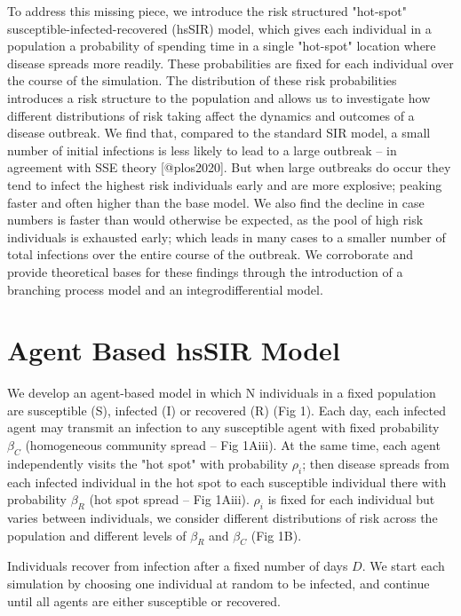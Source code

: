 \documentclass[9pt,twocolumn,twoside, lineno]{pnas-new}
\begin{document}
To address this missing piece, we introduce the risk structured "hot-spot"
susceptible-infected-recovered (hsSIR) model, which gives each individual
in a population a probability of spending time in a single "hot-spot" location
where disease spreads more readily. These probabilities are fixed for each individual
over the course of the simulation. The distribution of these risk probabilities
introduces a risk structure to the population and allows us to investigate how
different distributions of risk taking affect the dynamics and outcomes of
a disease outbreak. We find that, compared to the standard SIR model, a small
number of initial infections is less likely to lead to a large outbreak  – in
agreement with SSE theory [@plos2020]. But when large outbreaks do occur they
tend to infect the highest risk individuals early and are more explosive;
peaking faster and often higher than the base model. We also find the decline
in case numbers is faster than would otherwise be expected, as the pool of high
risk individuals is exhausted early; which leads in many cases to a smaller
number of total infections over the entire course of the outbreak. We
corroborate and provide theoretical bases for these findings through the
introduction of a branching process model and an integrodifferential model.


\section*{Agent Based hsSIR Model}

We develop an agent-based model in which N individuals in a fixed population
are susceptible (S), infected (I) or recovered (R) (Fig 1). Each day, each
infected agent may transmit an infection to any susceptible agent with fixed
probability $\beta_C$ (homogeneous community spread – Fig 1Aiii). At the same
time, each agent independently visits the "hot spot" with probability $\rho_i$;
then disease spreads from each infected individual in the hot spot to each
susceptible individual there with probability $\beta_R$ (hot spot spread –
Fig 1Aiii). $\rho_i$ is fixed for each individual but varies between individuals,
we consider different distributions of risk across the population and different
levels of $\beta_R$ and $\beta_C$ (Fig 1B).

Individuals recover from infection after a fixed number of days $D$. We start
each simulation by choosing one individual at random to be infected, and
continue until all agents are either susceptible or recovered.
\end{document}
